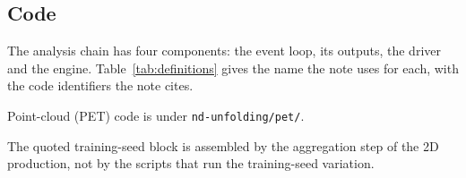 \subsection{Code}
\label{app:codebase}

The analysis chain has four components: the event loop, its outputs, the driver and the engine. Table~\ref{tab:definitions} gives the name the note uses for each, with the code identifiers the note cites.

Point-cloud (PET) code is under \texttt{nd-unfolding/pet/}.

The quoted training-seed block is assembled by the aggregation step of the 2D production, not by the scripts that run the training-seed variation.
